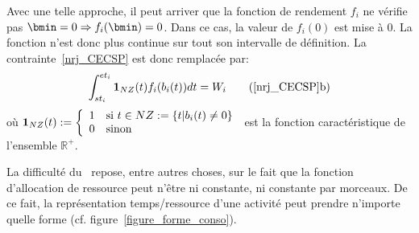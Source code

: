 Avec une telle approche, il peut arriver que la fonction de rendement
$f_i$ ne vérifie pas $\bmin=0 \Rightarrow f_i(\bmin)=0$. Dans ce cas,
la valeur de $f_i(0)$ est mise à $0$. La fonction n'est donc plus
continue sur tout son intervalle de définition. La
contrainte~\eqref{nrj_CECSP} est donc remplacée par:
\begin{equation}
  \int_{st_i}^{et_i}{\bf 1}_{NZ}(t)f_i(b_i(t))dt = W_i \tag{\ref{nrj_CECSP}b}
\end{equation}
\noindent 
où ${\bf 1}_{NZ}(t):=\left\{
  \begin{array}{ll}
    1 & \text{si }t \in NZ:=\{t|b_i(t)\neq0\}\\
    0 & \text{sinon}
  \end{array}
\right.$ est la fonction caractéristique de l'ensemble $\mathbb{R}^+$.

La difficulté du \CECSP~repose, entre autres choses, sur le fait que la
fonction d'allocation de ressource peut n'être ni constante, ni
constante par morceaux. De ce fait, la représentation temps/ressource
d'une activité peut prendre n'importe quelle forme
(cf. figure~\ref{figure_forme_conso}). 

